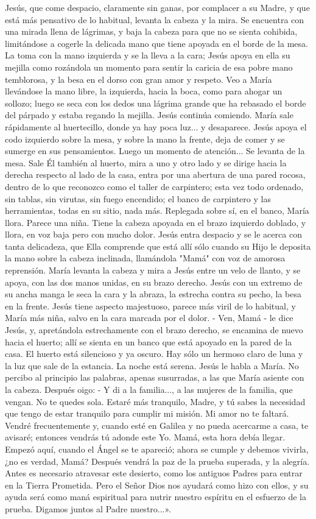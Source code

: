 \documentclass[12pt, twoside, openright]{book} %
\begin{document}
Jesús, que come despacio, claramente sin ganas, por complacer a su Madre, y que está más pensativo de lo habitual, levanta la cabeza y la mira. Se encuentra con una mirada llena de lágrimas, y baja la cabeza para que no se sienta cohibida, limitándose a cogerle la delicada mano que tiene apoyada en el borde de la mesa. La toma con la mano izquierda y se la lleva a la cara; Jesús apoya en ella su mejilla como rozándola un momento para sentir la caricia de esa pobre mano temblorosa, y la besa en el dorso con gran amor y respeto.
Veo a María llevándose la mano libre, la izquierda, hacia la boca, como para ahogar un sollozo; luego se seca con los dedos una lágrima grande que ha rebasado el borde del párpado y estaba regando la mejilla.
Jesús continúa comiendo. María sale rápidamente al huertecillo, donde ya hay poca luz... y desaparece. Jesús apoya el codo izquierdo sobre la mesa, y sobre la mano la frente, deja de comer y se sumerge en sus pensamientos.
Luego un momento de atención... Se levanta de la mesa. Sale Él también al huerto, mira a uno y otro lado y se dirige hacia la derecha respecto al lado de la casa, entra por una abertura de una pared rocosa, dentro de lo que reconozco como el taller de carpintero; esta vez todo ordenado, sin tablas, sin virutas, sin fuego encendido; el banco de carpintero y las herramientas, todas en su sitio, nada más.
Replegada sobre sí, en el banco, María llora. Parece una niña. Tiene la cabeza apoyada en el brazo izquierdo doblado, y llora, en voz baja pero con mucho dolor. Jesús entra despacio y se le acerca con tanta delicadeza, que Ella comprende que está allí sólo cuando su Hijo le deposita la mano sobre la cabeza inclinada, llamándola "Mamá" con voz de amorosa reprensión.
María levanta la cabeza y mira a Jesús entre un velo de llanto, y se apoya, con las dos manos unidas, en su brazo derecho. Jesús con un extremo de su ancha manga le seca la cara y la abraza, la estrecha contra su pecho, la besa en la frente.
Jesús tiene aspecto majestuoso, parece más viril de lo habitual, y María más niña, salvo en la cara marcada por el dolor.
- Ven, Mamá - le dice Jesús, y, apretándola estrechamente con el brazo derecho, se encamina de nuevo hacia el huerto; allí se sienta en un banco que está apoyado en la pared de la casa. El huerto está silencioso y ya oscuro. Hay sólo un hermoso claro de luna y la luz que sale de la estancia. La noche está serena.
Jesús le habla a María. No percibo al principio las palabras, apenas susurradas, a las que María asiente con la cabeza.
Después oigo:
- Y di a la familia..., a las mujeres de la familia, que vengan. No te quedes sola. Estaré más tranquilo, Madre, y tú sabes la necesidad que tengo de estar tranquilo para cumplir mi misión. Mi amor no te faltará. Vendré frecuentemente y, cuando esté en Galilea y no pueda acercarme a casa, te avisaré; entonces vendrás tú adonde este Yo. Mamá, esta hora debía llegar. Empezó aquí, cuando el Ángel se te apareció; ahora se cumple y debemos vivirla, ¿no es verdad, Mamá? Después vendrá la paz de la prueba superada, y la alegría. Antes es necesario atravesar este desierto, como los antiguos Padres para entrar en la Tierra Prometida. Pero el Señor Dios nos ayudará como hizo con ellos, y su ayuda será como maná espiritual para nutrir nuestro espíritu en el esfuerzo de la prueba. Digamos juntos al Padre nuestro...».
\end{document}
